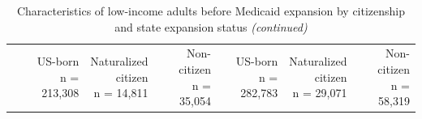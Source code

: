 \begin{landscape}
\begin{ThreePartTable}
\begin{longtable}[t]{lrrrrrr}
\midrule
\endfirsthead
\caption[]{Characteristics of low-income adults before Medicaid expansion by citizenship and state expansion status \textit{(continued)}}\\
\toprule
 & \makecell[br]{US-born\\n = 213,308} & \makecell[br]{Naturalized\\citizen\\n = 14,811} & \makecell[br]{Non-citizen\\n = 35,054} & \makecell[br]{US-born\\n = 282,783} & \makecell[br]{Naturalized\\citizen\\n = 29,071} & \makecell[br]{Non-citizen\\n = 58,319}\\
\midrule
\endhead


\end{longtable}
\end{ThreePartTable}
\end{landscape}
